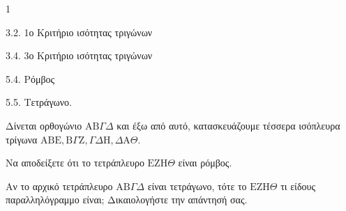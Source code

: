 \begin{ylh}{1}
    \item 3.2. 1ο Κριτήριο ισότητας τριγώνων
    \item 3.4. 3ο Κριτήριο ισότητας τριγώνων
    \item 5.4. Ρόμβος
    \item 5.5. Τετράγωνο.
\end{ylh}
Δίνεται ορθογώνιο $\mathrm{A}\mathrm{B}\Gamma\Delta$ και έξω από αυτό, κατασκευάζουμε τέσσερα ισόπλευρα τρίγωνα $\mathrm{A}\mathrm{B}\mathrm{E}, \mathrm{B}\Gamma\mathrm{Z}, \Gamma\Delta\mathrm{H}, \Delta\mathrm{A}\Theta$.
\begin{alist}
    \item Να αποδείξετε ότι το τετράπλευρο $\mathrm{E}\mathrm{Z}\mathrm{H}\Theta$ είναι ρόμβος. 
    \item Αν το αρχικό τετράπλευρο $\mathrm{A}\mathrm{B}\Gamma\Delta$ είναι τετράγωνο, τότε το $\mathrm{E}\mathrm{Z}\mathrm{H}\Theta$ τι είδους παραλληλόγραμμο είναι; Δικαιολογήστε την απάντησή σας. 
\end{alist}
